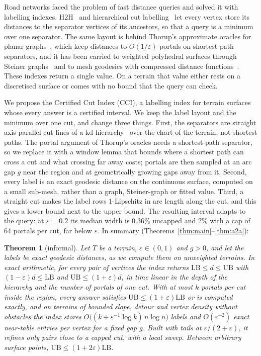 \documentclass[sigconf,nonacm,screen]{acmart}
\newcommand{\cci}{CCI\xspace}
\newcommand{\LB}{\mathrm{LB}}
\newcommand{\UB}{\mathrm{UB}}
\newcommand{\eps}{\varepsilon}
\newtheorem*{headline}{Theorem}
\begin{document}
Road networks faced the problem of fast distance queries and solved it with labelling indexes.
H2H~\cite{ouyang2018hierarchy} and hierarchical cut labelling~\cite{farhan2023hierarchical} let every vertex store
its distances to the separator vertices of its ancestors, so that a query is a minimum over one separator. The same
layout is behind Thorup's approximate oracles for planar graphs~\cite{thorup2004compact}, which keep distances to
$O(1/\eps)$ portals on shortest-path separators, and it has been carried to weighted polyhedral surfaces through
Steiner graphs~\cite{aleksandrov2010algorithms,djidjev2011approximate} and to mesh geodesics with compressed
distance functions~\cite{gotsman2022compressing}. These indexes return a single value. On a terrain that value
either rests on a discretised surface or comes with no bound that the query can check.

We propose the Certified Cut Index (\cci), a labelling index for terrain surfaces whose every answer is a certified
interval. We keep the label layout and the minimum over one cut, and change three things. First, the separators are
straight axis-parallel cut lines of a kd hierarchy~\cite{bentley1975multidimensional} over the chart of the terrain,
not shortest paths. The portal argument of Thorup's oracles needs a shortest-path separator, so we replace it with a
window lemma that bounds where a shortest path can cross a cut and what crossing far away costs; portals are then
sampled at an arc gap $g$ near the region and at geometrically growing gaps away from it. Second, every label is an
exact geodesic distance on the continuous surface, computed on a small sub-mesh, rather than a graph, Steiner-graph
or fitted value. Third, a straight cut makes the label rows 1-Lipschitz in arc length along the cut, and this gives a
lower bound next to the upper bound. The resulting interval adapts to the query: at $\eps=0.2$ its median width is
0.36\% uncapped and 2\% with a cap of 64 portals per cut, far below $\eps$. In summary
(Theorems~\ref{thm:main}--\ref{thm:a2a}):

\begin{headline}[informal]
Let $T$ be a terrain, $\eps\in(0,1)$ and $g>0$, and let the labels be exact geodesic distances, as we compute
them on unweighted terrains. In exact arithmetic, for every pair of vertices the index returns $\LB\le d\le\UB$
with $(1-\eps)d\le\LB$ and $\UB\le(1+\eps)d$, in time linear in the depth of the hierarchy and the number of
portals of one cut. With at most $k$ portals per cut inside the region, every answer satisfies
$\UB\le(1+\eps)\LB$ or is computed exactly, and on terrains of bounded slope, detour and vertex density without
obstacles the index stores $O\big((k+\eps^{-1}\log k)\,n\log n\big)$ labels and $O(\eps^{-2})$ exact near-table entries
per vertex for a fixed gap $g$. Built with tails at $\eps/(2+\eps)$, it refines only pairs close to a capped cut, with
a local sweep. Between arbitrary surface points, $\UB\le(1+2\eps)\LB$.
\end{headline}
\end{document}
